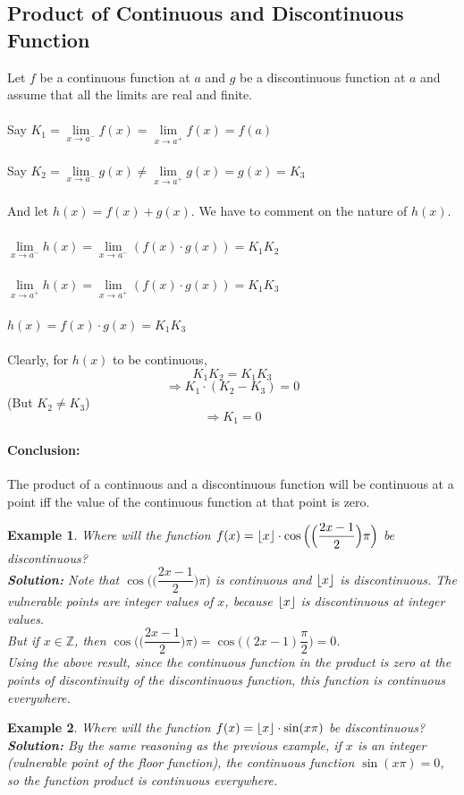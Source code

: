 \documentclass[14]{article}
\DeclarePairedDelimiter\floor{\lfloor}{\rfloor}
\newtheorem*{ex}{Example}
\theoremstyle{definition}
\theoremstyle{case}
\begin{document}
\subsection{Product of Continuous and Discontinuous Function}
Let $f$ be a continuous function at $a$ and $g$ be a discontinuous function at $a$ and assume that all the limits are real and finite.\\\\
Say $K_1 = \lim\limits_{x \to a^-} f(x) = \lim\limits_{x \to a^+} f(x) = f(a)$\\\\
Say $K_2 = \lim\limits_{x \to a^-} g(x) \neq \lim\limits_{x \to a^+} g(x) = g(x) = K_3$\\\\
And let $h(x) = f(x) + g(x)$. We have to comment on the nature of $h(x)$.\\\\
$\lim\limits_{x \to a^-} h(x) = \lim\limits_{x \to a^-} (f(x) \cdot g(x)) = K_1 K_2$\\\\
$\lim\limits_{x \to a^+} h(x) = \lim\limits_{x \to a^+} (f(x) \cdot g(x)) = K_1 K_3$\\\\
$h(x) = f(x) \cdot g(x) = K_1 K_3$\\\\
Clearly, for $h(x)$ to be continuous,
\[K_1 K_2 = K_1 K_3\]
\[\Rightarrow K_1 \cdot (K_2 - K_3) = 0\]
(But $K_2 \neq K_3$)
\[\Rightarrow K_1 = 0\]
\paragraph{Conclusion:}The product of a continuous and a discontinuous function will be continuous at a point iff the value of the continuous function at that point is zero.
\begin{ex}
Where will the function $f(x) = \floor{x} \cdot \cos\Big(\Big(\dfrac{2x-1}{2}\Big) \pi\Big)$ be discontinuous?\\
\textbf{Solution:} Note that $\cos\Big(\Big(\dfrac{2x-1}{2}\Big) \pi\Big)$ is continuous and $\floor{x}$ is discontinuous.
The vulnerable points are integer values of $x$, because $\floor{x}$ is discontinuous at integer values.\\
But if $x \in \mathbb{Z}$, then $\cos\Big(\Big(\dfrac{2x-1}{2}\Big) \pi\Big) = \cos\Big((2x-1)\dfrac{\pi}{2}\Big) = 0$.\\
Using the above result, since the continuous function in the product is zero at the points of discontinuity of the discontinuous function, this function is continuous everywhere.
\end{ex}
\begin{ex}
Where will the function $f(x) = \floor{x} \cdot \sin(x \pi)$ be discontinuous?\\
\textbf{Solution:} By the same reasoning as the previous example, if $x$ is an integer (vulnerable point of the floor function), the continuous function $\sin(x\pi) = 0$, so the function product is continuous everywhere.
\end{ex}
\end{document}
